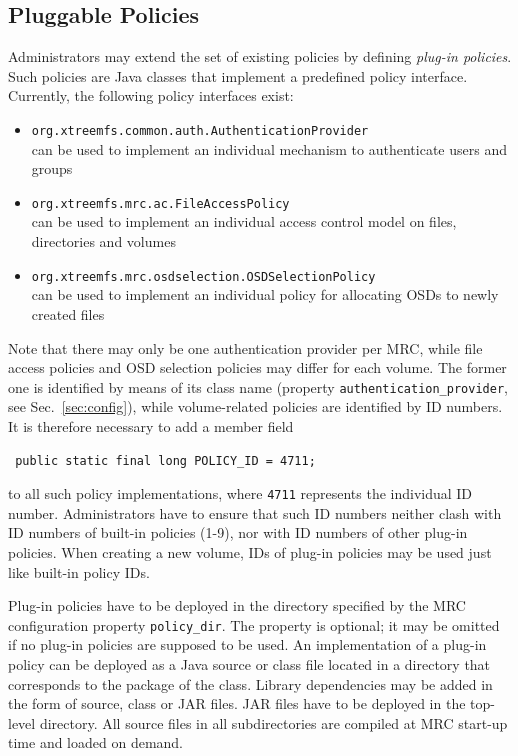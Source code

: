 \documentclass[a4paper,10pt]{book}
\begin{document}
\subsection{Pluggable Policies}

Administrators may extend the set of existing policies by defining \textit{plug-in policies}. Such policies are Java classes that implement a predefined policy interface. Currently, the following policy interfaces exist:

\begin{itemize}
 \item \texttt{org.xtreemfs.common.auth.AuthenticationProvider}\\
   can be used to implement an individual mechanism to authenticate users and groups
 \item \texttt{org.xtreemfs.mrc.ac.FileAccessPolicy}\\
   can be used to implement an individual access control model on files, directories and volumes
 \item \texttt{org.xtreemfs.mrc.osdselection.OSDSelectionPolicy}\\
   can be used to implement an individual policy for allocating OSDs to newly created files
\end{itemize}

Note that there may only be one authentication provider per MRC, while file access policies and OSD selection policies may differ for each volume. The former one is identified by means of its class name (property \texttt{authentication\_provider}, see Sec.\ \ref{sec:config}), while volume-related policies are identified by ID numbers. It is therefore necessary to add a member field

\begin{verbatim}
 public static final long POLICY_ID = 4711;
\end{verbatim}

to all such policy implementations, where \texttt{4711} represents the individual ID number. Administrators have to ensure that such ID numbers neither clash with ID numbers of built-in policies (1-9), nor with ID numbers of other plug-in policies. When creating a new volume, IDs of plug-in policies may be used just like built-in policy IDs.

Plug-in policies have to be deployed in the directory specified by the MRC configuration property \texttt{policy\_dir}. The property is optional; it may be omitted if no plug-in policies are supposed to be used. An implementation of a plug-in policy can be deployed as a Java source or class file located in a directory that corresponds to the package of the class. Library dependencies may be added in the form of source, class or JAR files. JAR files have to be deployed in the top-level directory. All source files in all subdirectories are compiled at MRC start-up time and loaded on demand.
\end{document}
